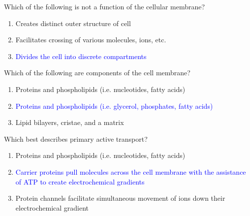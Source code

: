 \documentclass[11pt,fleqn]{book}
\begin{document}
\begin{descriptions}
\begin{center}
\end{center}
\begin{exercise}
    Which of the following is not a function of the cellular membrane?
    \begin{enumerate}
        \item Creates distinct outer structure of cell
        \item Facilitates crossing of various molecules, ions, etc.
        \item \textcolor{blue}{Divides the cell into discrete compartments}
    \end{enumerate}
\end{exercise}
\begin{exercise}
    Which of the following are components of the cell membrane?
    \begin{enumerate}
        \item Proteins and phospholipids (i.e. nucleotides, fatty acids)
        \item \textcolor{blue}{Proteins and phospholipids (i.e. glycerol, phosphates, fatty acids)}
        \item Lipid bilayers, cristae, and a matrix
    \end{enumerate}
\end{exercise}
\begin{exercise}
    Which best describes primary active transport?
    \begin{enumerate}
        \item Proteins and phospholipids (i.e. nucleotides, fatty acids)
        \item \textcolor{blue}{Carrier proteins pull molecules across the cell membrane with the assistance of ATP to create electrochemical gradients}
        \item Protein channels facilitate simultaneous movement of ions down their electrochemical gradient
    \end{enumerate}
\end{exercise}
\end{descriptions}
\end{document}
